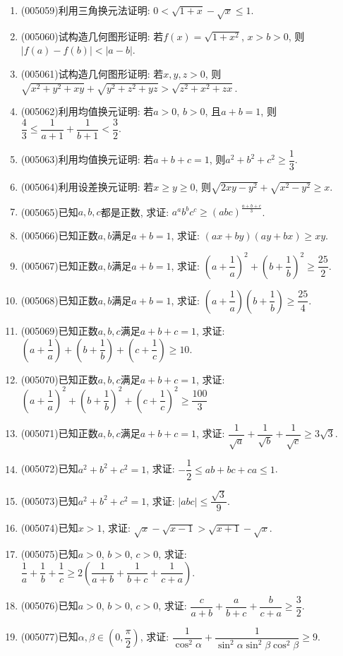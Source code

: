 \documentclass[10pt,a4paper]{article}
\begin{document}
\begin{enumerate}[1.]
\item {\tiny (005059)}利用三角换元法证明: $0<\sqrt{1+x}-\sqrt x\le 1$.
\item {\tiny (005060)}试构造几何图形证明: 若$f(x)=\sqrt{1+x^2}$, $x>b>0$, 则$|f(a)-f(b)|<|a-b|$.
\item {\tiny (005061)}试构造几何图形证明: 若$x,y,z>0$, 则$\sqrt{x^2+y^2+xy}+\sqrt{y^2+z^2+yz}>\sqrt{z^2+x^2+zx}$.
\item {\tiny (005062)}利用均值换元证明: 若$a>0$, $b>0$, 且$a+b=1$, 则$\dfrac 43\le \dfrac 1{a+1}+\dfrac 1{b+1}<\dfrac 32$.
\item {\tiny (005063)}利用均值换元证明: 若$a+b+c=1$, 则${a^2}+{b^2}+{c^2}\ge \dfrac 13$.
\item {\tiny (005064)}利用设差换元证明: 若$x\ge y\ge 0$, 则$\sqrt{2xy-{y^2}}+\sqrt{x^2-y^2}\ge x$.
\item {\tiny (005065)}已知$a,b,c$都是正数, 求证: $a^ab^bc^c\ge (abc)^{\frac{a+b+c}3}$.
\item {\tiny (005066)}已知正数$a,b$满足$a+b=1$, 求证: $(ax+by)(ay+bx)\ge xy$.
\item {\tiny (005067)}已知正数$a,b$满足$a+b=1$, 求证: $(a+\dfrac 1a)^2+(b+\dfrac 1b)^2\ge \dfrac{25}2$.
\item {\tiny (005068)}已知正数$a,b$满足$a+b=1$, 求证: $(a+\dfrac 1a)(b+\dfrac 1b)\ge \dfrac{25}4$.
\item {\tiny (005069)}已知正数$a,b,c$满足$a+b+c=1$, 求证: $(a+\dfrac 1a)+(b+\dfrac 1b)+(c+\dfrac 1c)\ge 10$.
\item {\tiny (005070)}已知正数$a,b,c$满足$a+b+c=1$, 求证: $(a+\dfrac 1a)^2+(b+\dfrac 1b)^2+(c+\dfrac 1c)^2\ge \dfrac{100}3$
\item {\tiny (005071)}已知正数$a,b,c$满足$a+b+c=1$, 求证: $\dfrac 1{\sqrt a}+\dfrac 1{\sqrt b}+\dfrac 1{\sqrt c}\ge 3\sqrt 3$.
\item {\tiny (005072)}已知$a^2+b^2+c^2=1$, 求证: $-\dfrac 12\le ab+bc+ca\le 1$.
\item {\tiny (005073)}已知$a^2+b^2+c^2=1$, 求证: $|abc|\le \dfrac{\sqrt 3}9$.
\item {\tiny (005074)}已知$x>1$, 求证: $\sqrt x-\sqrt{x-1}>\sqrt{x+1}-\sqrt x$.
\item {\tiny (005075)}已知$a>0$, $b>0$, $c>0$, 求证: $\dfrac 1a+\dfrac 1b+\dfrac 1c\ge 2(\dfrac 1{a+b}+\dfrac 1{b+c}+\dfrac 1{c+a})$.
\item {\tiny (005076)}已知$a>0$, $b>0$, $c>0$, 求证: $\dfrac c{a+b}+\dfrac a{b+c}+\dfrac b{c+a}\ge \dfrac 32$.
\item {\tiny (005077)}已知$\alpha ,\beta \in (0,\dfrac{\pi}2)$, 求证: $\dfrac 1{\cos^2\alpha}+\dfrac 1{\sin^2\alpha \sin^2\beta\cos^2\beta}\ge 9$.

\end{enumerate}
\end{document}
